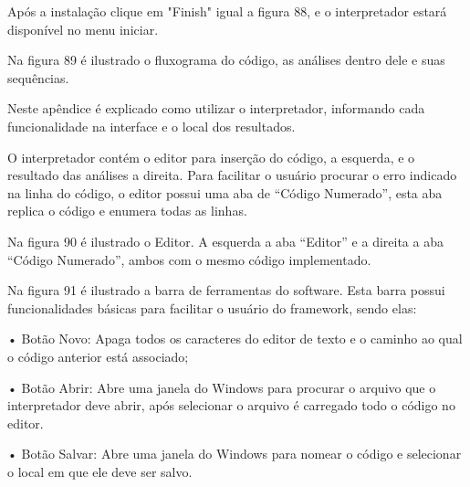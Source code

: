 \documentclass[12pt,oneside,a4paper,chapter=TITLE,section=TITLE,sumario=tradicional]{abntex2}
\begin{document}
Após a instalação clique em "Finish" igual a figura 88, e o interpretador estará disponível no menu iniciar.

\begin{figure}[H]
\end{figure}


Na figura 89 é ilustrado o fluxograma do código, as análises dentro dele e suas sequências.

\begin{figure}[H]
\end{figure}


Neste apêndice é explicado como utilizar o interpretador, informando cada funcionalidade na interface e o local dos resultados.

O interpretador contém o editor para inserção do código, a esquerda, e o resultado das análises a direita. Para facilitar o usuário procurar o erro indicado na linha do código, o editor possui uma aba de “Código Numerado”, esta aba replica o código e enumera todas as linhas. 

Na figura 90 é ilustrado o Editor. A esquerda a aba “Editor” e a direita a aba “Código Numerado”, ambos com o mesmo código implementado.

\begin{figure}[H]
\end{figure}

Na figura 91 é ilustrado a barra de ferramentas do software. Esta barra possui funcionalidades básicas para facilitar o usuário do framework, sendo elas:

•	Botão Novo: Apaga todos os caracteres do editor de texto e o caminho ao qual o código anterior está associado;

•	Botão Abrir: Abre uma janela do Windows para procurar o arquivo que o interpretador deve abrir, após selecionar o arquivo é carregado todo o código no editor.

•	Botão Salvar: Abre uma janela do Windows para nomear o código e selecionar o local em que ele deve ser salvo.
\end{document}
